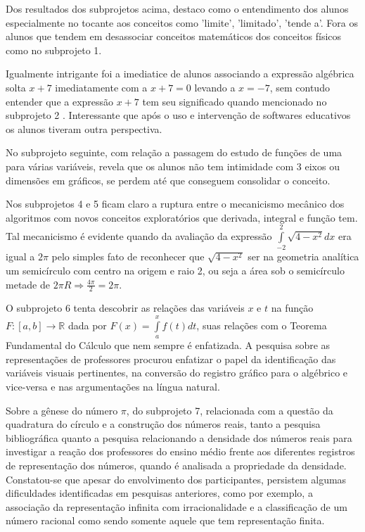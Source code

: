 \documentclass[
	12pt,				%
	openright,			%
	oneside,
	a4paper,			%
	chapter=TITLE,		%
	section=TITLE,		%
	sumario=abnt-6027-2012,
	english,			%
	brazil				%
]{abntex2}
\begin{document}
	Dos resultados dos subprojetos acima, destaco como o entendimento dos alunos especialmente no tocante aos conceitos como 'limite', 'limitado', 'tende a'. Fora os alunos que tendem em desassociar conceitos matemáticos dos conceitos físicos como no subprojeto 1.
	
	Igualmente intrigante foi a imediatice de alunos associando a expressão algébrica solta $ x+7 $ imediatamente com a  $ x + 7 = 0 $ levando a $ x = -7 $, sem contudo entender que a expressão  $ x + 7 $ tem seu significado quando mencionado no subprojeto 2 . Interessante que após o uso e intervenção de softwares educativos os alunos tiveram outra perspectiva.
	
	No subprojeto seguinte, com relação a passagem do estudo de funções de uma para várias variáveis, revela que os alunos não tem intimidade com 3 eixos ou dimensões em gráficos, se perdem até que conseguem consolidar o conceito.
	
	Nos subprojetos 4 e 5 ficam claro a ruptura entre o mecanicismo mecânico dos algoritmos com novos conceitos exploratórios que derivada, integral e função tem. Tal mecanicismo é evidente quando da avaliação da expressão $\displaystyle \int\limits_{-2}^{2} \sqrt{4-x^2} dx $ era igual a $2\pi$ pelo simples fato de reconhecer que $\displaystyle \sqrt{4-x^2}$ ser na geometria analítica um semicírculo com centro na origem e raio 2, ou seja a área sob o semicírculo metade de $\displaystyle 2 \pi R \Rightarrow \frac{4\pi}{2} = 2\pi $.
	
	O subprojeto 6 tenta descobrir as relações das variáveis $x$ e $t$ na função $\displaystyle F: [a, b] \rightarrow \mathds{R} $ dada por $\displaystyle F(x) = \int\limits_a^x { f(t) dt} $, suas relações com o Teorema Fundamental do Cálculo que nem sempre é enfatizada. A pesquisa sobre as representações de professores procurou enfatizar o papel da identificação das variáveis visuais pertinentes, na conversão do registro gráfico para o algébrico e vice-versa e nas argumentações na língua natural.
	
	Sobre a gênese do número $ \pi $, do subprojeto 7, relacionada com a questão da quadratura do círculo e a construção dos números reais, tanto a pesquisa bibliográfica quanto a pesquisa relacionando a densidade dos números reais para investigar a reação dos professores do ensino médio frente aos diferentes registros de representação dos números, quando é analisada a propriedade da densidade. Constatou-se que apesar do envolvimento dos participantes, persistem algumas dificuldades identificadas em pesquisas anteriores, como por exemplo, a associação da representação infinita com irracionalidade e a classificação de um número racional como sendo somente aquele que tem representação finita.
	
\end{document}
